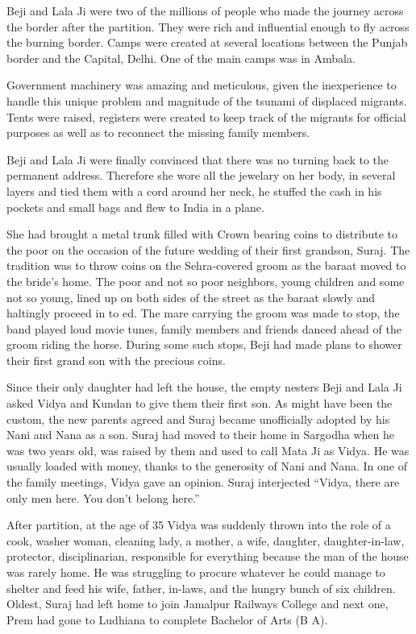 Beji and Lala Ji were two of the millions of people who made the journey across the border after the partition. They were rich and influential enough to fly across the burning border. Camps were created at several locations between the Punjab border and the Capital, Delhi. One of the main camps was in Ambala. 

Government machinery was amazing and meticulous, given the inexperience to handle this unique problem and magnitude of the tsunami of displaced migrants. Tents were raised, registers were created to keep track of the migrants for official purposes as well as to reconnect the missing family members. 

Beji and Lala Ji were finally convinced that there was no turning back to the permanent address. Therefore she wore all the jewelary on her body, in several layers and tied them with a cord around her neck, he stuffed the cash in his pockets and small bags and flew to India in a plane. 

She had brought a metal trunk filled with Crown bearing coins to distribute to the poor on the occasion of the future wedding of their first grandson, Suraj. The tradition was to throw coins on the Sehra-covered groom as the baraat moved to the bride's home. The poor and not so poor neighbors, young children and some not so young, lined up on both sides of the street as the  baraat slowly and haltingly proceed in to ed. The mare carrying the groom was made to stop, the band played loud movie tunes, family members and friends danced ahead of the groom riding the horse. During some such stops, Beji had made plans to shower their first grand son with the precious coins. 

Since their only daughter had left the house, the empty nesters Beji and Lala Ji asked Vidya and Kundan to give them their first son. As might have been the custom, the new parents agreed and Suraj became unofficially adopted by his Nani and Nana as a son. Suraj had moved to their home in Sargodha when he was two years old, was raised by them and used to call Mata Ji as Vidya. He was usually loaded with money, thanks to the generosity of Nani and Nana. In one of the family meetings, Vidya gave an opinion. Suraj interjected “Vidya, there are only men here. You don’t belong here.”

After partition, at the age of 35 Vidya was suddenly thrown into the role of a cook, washer woman, cleaning lady, a mother, a wife, daughter, daughter-in-law, protector, disciplinarian, responsible for everything because the man of the house was rarely home. He was struggling to procure whatever he could manage to shelter and feed his wife, father, in-laws, and the hungry bunch of six children. Oldest, Suraj had left home to join Jamalpur Railways College and next one, Prem had gone to Ludhiana to complete Bachelor of Arts (B A). 

